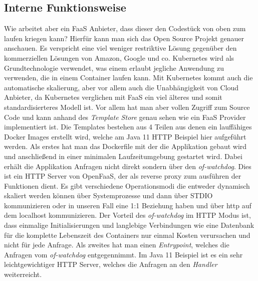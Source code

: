\documentclass[12pt, a4paper]{article}
\begin{document}

\subsection{Interne Funktionsweise}
Wie arbeitet aber ein \ac{FaaS} Anbieter, dass dieser den Codestück von oben zum laufen kriegen kann?
\newline
Hierfür kann man sich das Open Source Projekt \cite[OpenFaaS]{openfaas_github} genauer anschauen.
Es verspricht eine viel weniger restriktive Lösung gegenüber den kommerziellen Lösungen von Amazon, Google und co.
Kubernetes wird als Grundtechnologie verwendet, was einem erlaubt jegliche Anwendung zu verwenden, die in einem Container laufen kann.
Mit Kubernetes kommt auch die automatische skalierung, aber vor allem auch die Unabhängigkeit von Cloud Anbieter, da Kubernetes verglichen mit \ac{FaaS} ein viel älteres und somit standardisierteres Modell ist.
\newline
Vor allem hat man aber vollen Zugriff zum Source Code und kann anhand des \emph{Template Store}\cite{openfaas_templateStore} genau sehen wie ein \ac{FaaS} Provider implementiert ist.
Die Templates bestehen aus 4 Teilen aus denen ein lauffähiges Docker Images erstellt wird, welche am Java 11 HTTP Beispiel \cite{openfaas_templateStore_java11} hier aufgeführt werden.
\newline
Als erstes hat man das Dockerfile mit der die Applikation gebaut wird und anschließend in einer minimalen Laufzeitumgebung gestartet wird.
\newline
Dabei erhält die Applikation Anfragen nicht direkt sondern über den \emph{of-watchdog}\cite{openfaas_ofWatchdog}.
Dies ist ein HTTP Server von OpenFaaS, der als reverse proxy zum ausführen der Funktionen dient.
Es gibt verschiedene Operationsmodi die entweder dynamisch skaliert werden können über Systemprozesse und dann über STDIO kommunizieren oder in unseren Fall eine 1:1 Beziehung haben und über http auf dem localhost kommunizieren.
Der Vorteil des \emph{of-watchdog} im HTTP Modus ist, dass einmalige Initialisierungen und langlebige Verbindungen wie eine Datenbank für die komplette Lebenszeit des Containers nur einmal Kosten verursachen und nicht für jede Anfrage.
\newline
Als zweites hat man einen \emph{Entrypoint}, welches die Anfragen vom \emph{of-watchdog} entgegennimmt. Im Java 11 Beispiel ist es ein sehr leichtgewichtiger HTTP Server, welches die Anfragen an den \emph{Handler} weiterreicht.
\newline
\end{document}
